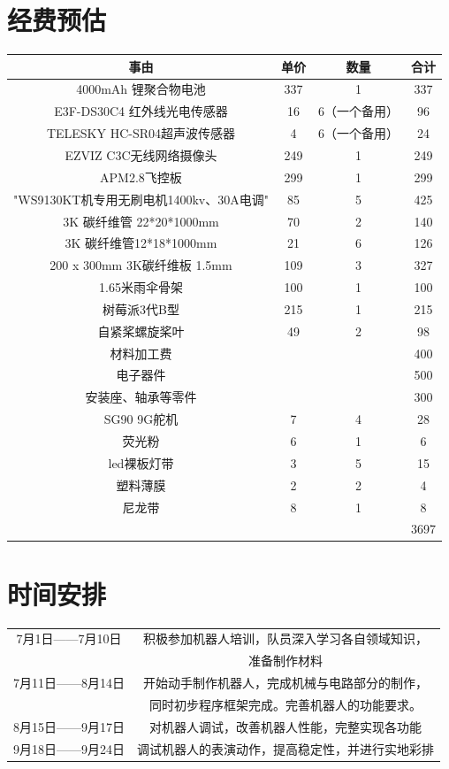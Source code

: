 \documentclass{ctexart}
\begin{document}
\section{经费预估}
\begin{center}
\begin{longtable}{|c|c|c|c|}
\hline
事由&	单价	&数量	&合计\\
\hline
4000mAh 锂聚合物电池	&337	&1	&337\\
\hline
E3F-DS30C4 红外线光电传感器	&16&	6（一个备用）	&96\\
\hline
TELESKY HC-SR04超声波传感器	&4	&6（一个备用）	&24\\
\hline
EZVIZ C3C无线网络摄像头	&249	&1	&249\\
\hline
APM2.8飞控板	&299	&1	&299\\
\hline
"WS9130KT机专用无刷电机1400kv、30A电调"	&85&	5	&425\\
\hline
3K 碳纤维管 22*20*1000mm	&70	&2	&140\\
\hline
3K 碳纤维管12*18*1000mm	&21	&6	&126\\
\hline
200 x 300mm 3K碳纤维板 1.5mm	&109	&3	&327\\
\hline
1.65米雨伞骨架	&100	&1	&100\\
\hline
树莓派3代B型	&215	&1	&215\\
\hline
自紧桨螺旋桨叶	&49&	2	&98\\
\hline
材料加工费		&&&	400\\
\hline
电子器件	&&&		500\\
\hline
安装座、轴承等零件	&&&		300\\
\hline
SG90 9G舵机	&7	&4	&28\\
\hline
荧光粉	&6	&1	&6\\
\hline
led裸板灯带	&3&	5	&15\\
\hline
塑料薄膜	&2	&2	&4\\
\hline
尼龙带	&8	&1	&8\\
\hline
			&&&3697\\
			\hline

\end{longtable}
\end{center}

\section{时间安排}
\centering
\begin{center}
\begin{longtable}{|c|c|}
\hline
7月1日——7月10日&积极参加机器人培训，队员深入学习各自领域知识，\\
&准备制作材料\\
\hline
7月11日——8月14日&开始动手制作机器人，完成机械与电路部分的制作，\\
&同时初步程序框架完成。完善机器人的功能要求。\\
\hline
8月15日——9月17日&对机器人调试，改善机器人性能，完整实现各功能\\
\hline
9月18日——9月24日&调试机器人的表演动作，提高稳定性，并进行实地彩排\\
\hline
\end{longtable}
\end{center}




\end{document}
